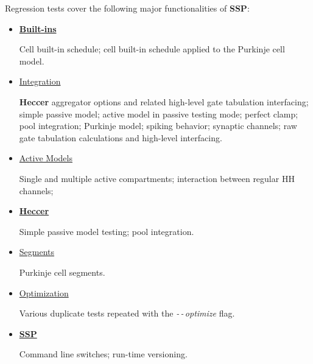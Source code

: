 \documentclass[12pt]{article}
\begin{document}
Regression tests cover the following major functionalities of {\bf SSP}:
\begin{itemize}

\item[]\href{http://neurospaces.sourceforge.net/neurospaces_project/ssp/tests/html/specifications/builtins/main.html}{\bf Built-ins}

Cell built-in schedule; cell built-in schedule applied to the Purkinje cell model.

\item[]\href{http://neurospaces.sourceforge.net/neurospaces_project/ssp/tests/html/specifications/integration/main.html}{Integration}

{\bf Heccer} aggregator options and related high-level gate tabulation interfacing; simple passive model; active model in passive testing mode; perfect clamp; pool integration; Purkinje model; spiking behavior; synaptic channels; raw gate tabulation calculations and high-level interfacing. 

\item[]\href{http://neurospaces.sourceforge.net/neurospaces_project/ssp/tests/html/specifications/integration/active/main.html}{Active Models}

Single and multiple active compartments; interaction between regular HH channels; 

\item[]\href{http://neurospaces.sourceforge.net/neurospaces_project/ssp/tests/html/specifications/integration/heccer/main.html}{\bf Heccer}

Simple passive model testing; pool integration.

\item[]\href{http://neurospaces.sourceforge.net/neurospaces_project/ssp/tests/html/specifications/integration/segments/main.html}{Segments}

Purkinje cell segments.

\item[]\href{http://neurospaces.sourceforge.net/neurospaces_project/ssp/tests/html/specifications/optimization/main.html}{Optimization}

Various duplicate tests repeated with the {\it -\,-\,optimize} flag.

\item[]\href{http://neurospaces.sourceforge.net/neurospaces_project/ssp/tests/html/specifications/ssp/main.html}{\bf SSP}

Command line switches; run-time versioning.

\end{itemize}
\end{document}
